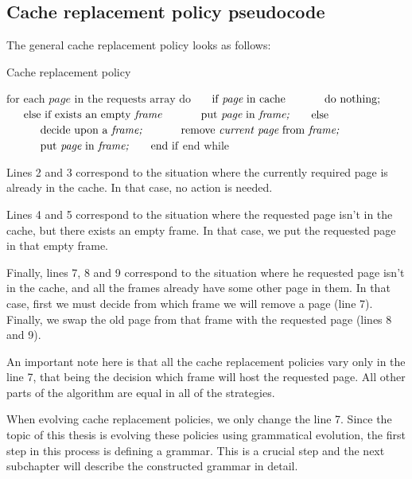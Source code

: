 \subsection{Cache replacement policy pseudocode}
The general cache replacement policy looks as follows:

\begin{algorithm}[]
\caption{Cache replacement policy}
\begin{algorithmic}[1]
\State $\text{for each } \textit{page} \text{ in the requests array do}$
\State $\indent \text{if } \textit{page} \text{ in cache} $
\State $\indent \indent \text{do nothing;} $
\State $\indent \text{else if exists an empty } \textit{frame} $
\State $\indent \indent \text{put } \textit{page} \text{ in } \textit{frame;} $
\State $\indent \text{else} $
\State $\indent \indent \text{decide upon a } \textit{frame;}$
\State $\indent \indent \text{remove } \textit{current page} 
\text{ from } \textit{frame;}$
\State $\indent \indent \text{put } \textit{page} \text{ in } \textit{frame;} $
\State $\indent \text{end if}$
\State $\text{end while}$
\end{algorithmic}
\end{algorithm}

Lines 2 and 3 correspond to the situation where the currently required page is already in the cache. In that case, no action is needed.

Lines 4 and 5 correspond to the situation where the requested page isn't in the cache, but there exists an empty frame. In that case, we put the requested page in that empty frame.

Finally, lines 7, 8 and 9 correspond to the situation where he requested page isn't in the cache, and all the frames already have some other page in them. In that case, first we must decide from which frame we will remove a page (line 7). Finally, we swap the old page from that frame with the requested page (lines 8 and 9).

An important note here is that all the cache replacement policies vary only in the line 7, that being the decision which frame will host the requested page. All other parts of the algorithm are equal in all of the strategies. 

When evolving cache replacement policies, we only change the line 7. Since the topic of this thesis is evolving these policies using grammatical evolution, the first step in this process is defining a grammar. This is a crucial step and the next subchapter will describe the constructed grammar in detail.